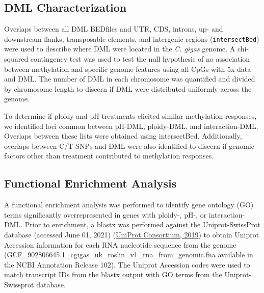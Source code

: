 \documentclass [11pt, proquest] {uwthesis}[2015/03/03]
\begin{document}
\hypertarget{dml-characterization-2}{%
\subsection{DML Characterization}\label{dml-characterization-2}}

Overlaps between all DML BEDfiles and UTR, CDS, introns, up- and downstream flanks, transposable elements, and intergenic regions (\texttt{intersectBed}) were used to describe where DML were located in the \emph{C. gigas} genome. A chi-squared contingency test was used to test the null hypothesis of no association between methylation and specific genome features using all CpGs with 5x data and DML. The number of DML in each chromosome was quantified and divided by chromosome length to discern if DML were distributed uniformly across the genome.

To determine if ploidy and pH treatments elicited similar methylation responses, we identified loci common between pH-DML, ploidy-DML, and interaction-DML. Overlaps between these lists were obtained using intersectBed. Additionally, overlaps between C/T SNPs and DML were also identified to discern if genomic factors other than treatment contributed to methylation responses.

\hypertarget{functional-enrichment-analysis}{%
\subsection{Functional Enrichment Analysis}\label{functional-enrichment-analysis}}

A functional enrichment analysis was performed to identify gene ontology (GO) terms significantly overrepresented in genes with ploidy-, pH-, or interaction-DML. Prior to enrichment, a blastx was performed against the Uniprot-SwissProt database (accessed June 01, 2021) (\protect\hyperlink{ref-UniProt_Consortium2019}{UniProt Consortium, 2019}) to obtain Uniprot Accession information for each RNA nucleotide sequence from the genome (GCF\_902806645.1\_cgigas\_uk\_roslin\_v1\_rna\_from\_genomic.fna available in the NCBI Annotation Release 102). The Uniprot Accession codes were used to match transcript IDs from the blastx output with GO terms from the Uniprot-Swissprot database.
\end{document}
